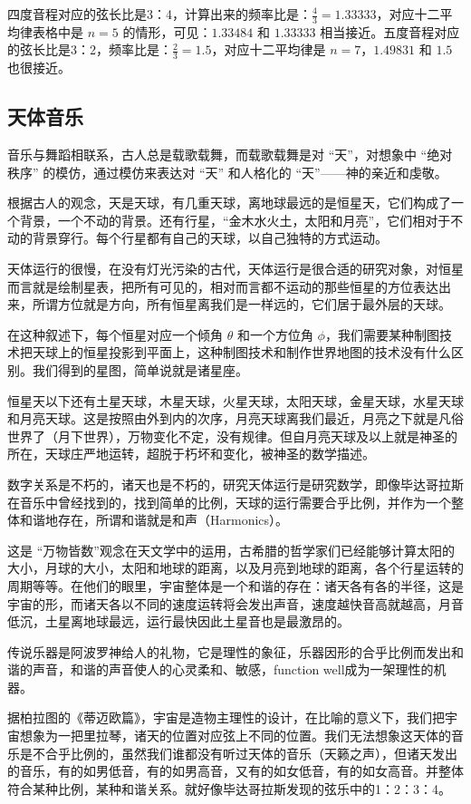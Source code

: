 四度音程对应的弦长比是3：4，计算出来的频率比是：$\frac{4}{3} = 1.33333$，对应十二平均律表格中是 $n = 5$ 的情形，可见：$1.33484$ 和 $1.33333$ 相当接近。五度音程对应的弦长比是3：2，频率比是：$\frac{2}{3} = 1.5$，对应十二平均律是 $n=7$，$1.49831$ 和 $1.5$ 也很接近。

\subsection{天体音乐}

音乐与舞蹈相联系，古人总是载歌载舞，而载歌载舞是对 “天”，对想象中 “绝对秩序” 的模仿，通过模仿来表达对 “天” 和人格化的 “天”——神的亲近和虔敬。

根据古人的观念，天是天球，有几重天球，离地球最远的是恒星天，它们构成了一个背景，一个不动的背景。还有行星，“金木水火土，太阳和月亮”，它们相对于不动的背景穿行。每个行星都有自己的天球，以自己独特的方式运动。

天体运行的很慢，在没有灯光污染的古代，天体运行是很合适的研究对象，对恒星而言就是绘制星表，把所有可见的，相对而言都不运动的那些恒星的方位表达出来，所谓方位就是方向，所有恒星离我们是一样远的，它们居于最外层的天球。

在这种叙述下，每个恒星对应一个倾角 $\theta $ 和一个方位角 $\phi $，我们需要某种制图技术把天球上的恒星投影到平面上，这种制图技术和制作世界地图的技术没有什么区别。我们得到的星图，简单说就是诸星座。

恒星天以下还有土星天球，木星天球，火星天球，太阳天球，金星天球，水星天球和月亮天球。这是按照由外到内的次序，月亮天球离我们最近，月亮之下就是凡俗世界了（月下世界），万物变化不定，没有规律。但自月亮天球及以上就是神圣的所在，天球庄严地运转，超脱于朽坏和变化，被神圣的数学描述。

数字关系是不朽的，诸天也是不朽的，研究天体运行是研究数学，即像毕达哥拉斯在音乐中曾经找到的，找到简单的比例，天球的运行需要合乎比例，并作为一个整体和谐地存在，所谓和谐就是和声（Harmonics）。

这是 “万物皆数”观念在天文学中的运用，古希腊的哲学家们已经能够计算太阳的大小，月球的大小，太阳和地球的距离，以及月亮到地球的距离，各个行星运转的周期等等。在他们的眼里，宇宙整体是一个和谐的存在：诸天各有各的半径，这是宇宙的形，而诸天各以不同的速度运转将会发出声音，速度越快音高就越高，月音低沉，土星离地球最远，运行最快因此土星音也是最激昂的。

传说乐器是阿波罗神给人的礼物，它是理性的象征，乐器因形的合乎比例而发出和谐的声音，和谐的声音使人的心灵柔和、敏感，function well成为一架理性的机器。

据柏拉图的《蒂迈欧篇》，宇宙是造物主理性的设计，在比喻的意义下，我们把宇宙想象为一把里拉琴，诸天的位置对应弦上不同的位置。我们无法想象这天体的音乐是不合乎比例的，虽然我们谁都没有听过天体的音乐（天籁之声），但诸天发出的音乐，有的如男低音，有的如男高音，又有的如女低音，有的如女高音。并整体符合某种比例，某种和谐关系。就好像毕达哥拉斯发现的弦乐中的1：2：3：4。

